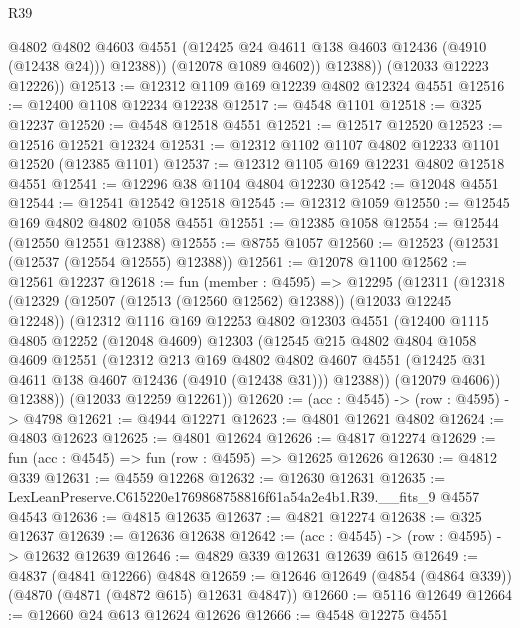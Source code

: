 \begin{lexlean}{R39}
\begin{coremodule}
                @4802
                @4802
                @4603
                @4551
                (@12425 @24 @4611 @138 @4603 @12436 (@4910 (@12438 @24)))
                @12388))
            (@12078 @1089 @4602))
          @12388))
      (@12033 @12223 @12226))
@12513 := @12312 @1109 @169 @12239 @4802 @12324 @4551
@12516 := @12400 @1108 @12234 @12238
@12517 := @4548 @1101
@12518 := @325 @12237
@12520 := @4548 @12518 @4551
@12521 := @12517 @12520
@12523 := @12516 @12521 @12324
@12531 := @12312 @1102 @1107 @4802 @12233 @1101 @12520 (@12385 @1101)
@12537 := @12312 @1105 @169 @12231 @4802 @12518 @4551
@12541 := @12296 @38 @1104 @4804 @12230
@12542 := @12048 @4551
@12544 := @12541 @12542 @12518
@12545 := @12312 @1059
@12550 := @12545 @169 @4802 @4802 @1058 @4551
@12551 := @12385 @1058
@12554 := @12544 (@12550 @12551 @12388)
@12555 := @8755 @1057
@12560 := @12523 (@12531 (@12537 (@12554 @12555) @12388))
@12561 := @12078 @1100
@12562 := @12561 @12237
@12618 := fun (member : @4595) =>
  @12295
    (@12311
      (@12318
        (@12329 (@12507 (@12513 (@12560 @12562) @12388)) (@12033 @12245 @12248))
        (@12312
          @1116
          @169
          @12253
          @4802
          @12303
          @4551
          (@12400
            @1115
            @4805
            @12252
            (@12048 @4609)
            @12303
            (@12545
              @215
              @4802
              @4804
              @1058
              @4609
              @12551
              (@12312
                @213
                @169
                @4802
                @4802
                @4607
                @4551
                (@12425 @31 @4611 @138 @4607 @12436 (@4910 (@12438 @31)))
                @12388))
            (@12079 @4606))
          @12388))
      (@12033 @12259 @12261))
@12620 := (acc : @4545) -> (row : @4595) -> @4798
@12621 := @4944 @12271
@12623 := @4801 @12621 @4802
@12624 := @4803 @12623
@12625 := @4801 @12624
@12626 := @4817 @12274
@12629 := fun (acc : @4545) => fun (row : @4595) => @12625 @12626
@12630 := @4812 @339
@12631 := @4559 @12268
@12632 := @12630 @12631
@12635 := LexLeanPreserve.C615220e1769868758816f61a54a2e4b1.R39.__fits_9 @4557 @4543
@12636 := @4815 @12635
@12637 := @4821 @12274
@12638 := @325 @12637
@12639 := @12636 @12638
@12642 := (acc : @4545) -> (row : @4595) -> @12632 @12639
@12646 := @4829 @339 @12631 @12639 @615
@12649 := @4837 (@4841 @12266) @4848
@12659 := @12646 @12649 (@4854 (@4864 @339)) (@4870 (@4871 (@4872 @615) @12631 @4847))
@12660 := @5116 @12649
@12664 := @12660 @24 @613 @12624 @12626
@12666 := @4548 @12275 @4551

\end{coremodule}
\end{lexlean}
